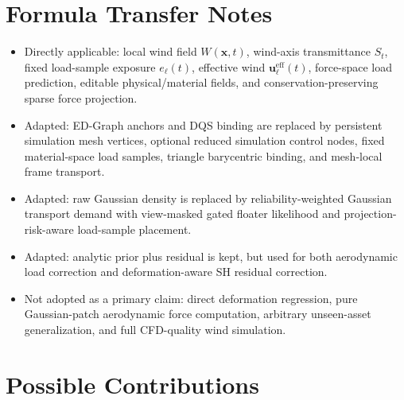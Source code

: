 \documentclass[11pt]{article}
\begin{document}
\section{Formula Transfer Notes}

\begin{itemize}
  \item Directly applicable: local wind field \(W(\mathbf{x},t)\), wind-axis transmittance \(S_t\), fixed load-sample exposure \(e_\ell(t)\), effective wind \(\mathbf{u}^{\mathrm{eff}}_\ell(t)\), force-space load prediction, editable physical/material fields, and conservation-preserving sparse force projection.
  \item Adapted: ED-Graph anchors and DQS binding are replaced by persistent simulation mesh vertices, optional reduced simulation control nodes, fixed material-space load samples, triangle barycentric binding, and mesh-local frame transport.
  \item Adapted: raw Gaussian density is replaced by reliability-weighted Gaussian transport demand with view-masked gated floater likelihood and projection-risk-aware load-sample placement.
  \item Adapted: analytic prior plus residual is kept, but used for both aerodynamic load correction and deformation-aware SH residual correction.
  \item Not adopted as a primary claim: direct deformation regression, pure Gaussian-patch aerodynamic force computation, arbitrary unseen-asset generalization, and full CFD-quality wind simulation.
\end{itemize}

\section{Possible Contributions}
\end{document}
